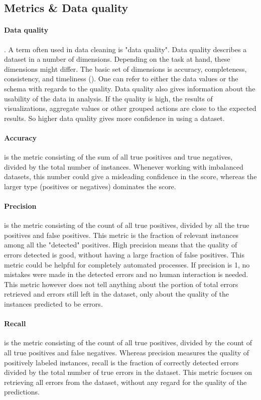\subsection{Metrics \& Data quality}
\paragraph{Data quality}. A term often used in data cleaning is "data quality". Data quality describes a dataset in a number of dimensions. Depending on the task at hand, these dimensions might differ. The basic set of dimensions is accuracy, completeness, consistency, and timeliness (\cite{Batini2009-aa}). One can refer to either the data values or the schema with regards to the quality. Data quality also gives information about the usability of the data in analysis. If the quality is high, the results of visualizations, aggregate values or other grouped actions are close to the expected results. So higher data quality gives more confidence in using a dataset.

\paragraph{Accuracy}
is the metric consisting of the sum of all true positives and true negatives, divided by the total number of instances. Whenever working with imbalanced datasets, this number could give a misleading confidence in the score, whereas the larger type (positives or negatives) dominates the score.

\paragraph{Precision}
is the metric consisting of the count of all true positives, divided by all the true positives and false positives. This metric is the fraction of relevant instances among all the "detected" positives. High precision means that the quality of errors detected is good, without having a large fraction of false positives. This metric could be helpful for completely automated processes. If precision is 1, no mistakes were made in the detected errors and no human interaction is needed. This metric however does not tell anything about the portion of total errors retrieved and errors still left in the dataset, only about the quality of the instances predicted to be errors.

\paragraph{Recall} 
is the metric consisting of the count of all true positives, divided by the count of all true positives and false negatives. Whereas precision measures the quality of positively labeled instances, recall is the fraction of correctly detected errors divided by the total number of true errors in the dataset. This metric focuses on retrieving all errors from the dataset, without any regard for the quality of the predictions.

